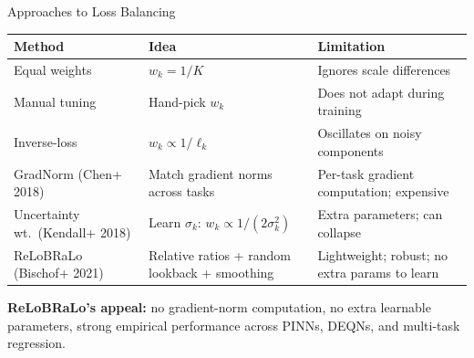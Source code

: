\documentclass[aspectratio=169,11pt]{beamer}
\newcommand{\emphc}[1]{\textcolor{harvardcrimson}{#1}}
\begin{document}
\begin{frame}{Approaches to Loss Balancing}
\begin{center}
\renewcommand{\arraystretch}{1.15}
{\footnotesize
\begin{tabular}{@{}p{3.2cm}p{3.8cm}p{4.2cm}@{}}
\toprule
\textbf{Method} & \textbf{Idea} & \textbf{Limitation} \\
\midrule
Equal weights & $w_k = 1/K$ & Ignores scale differences \\[1pt]
Manual tuning & Hand-pick $w_k$ & Does not adapt during training \\[1pt]
Inverse-loss & $w_k \propto 1/\ell_k$ & Oscillates on noisy components \\[1pt]
GradNorm (Chen+ 2018) & Match gradient norms across tasks & Per-task gradient computation; expensive \\[1pt]
Uncertainty wt.\ (Kendall+ 2018) & Learn $\sigma_k$: $w_k \!\propto\! 1/(2\sigma_k^2)$ & Extra parameters; can collapse \\[1pt]
\emphc{ReLoBRaLo} (Bischof+ 2021) & Relative ratios + random lookback + smoothing & \emphc{Lightweight; robust; no extra params to learn} \\
\bottomrule
\end{tabular}
}
\end{center}

\vspace{0.3em}
{\small \textbf{ReLoBRaLo's appeal:} no gradient-norm computation, no extra learnable parameters, strong empirical performance across PINNs, DEQNs, and multi-task regression.}
\end{frame}
\end{document}
